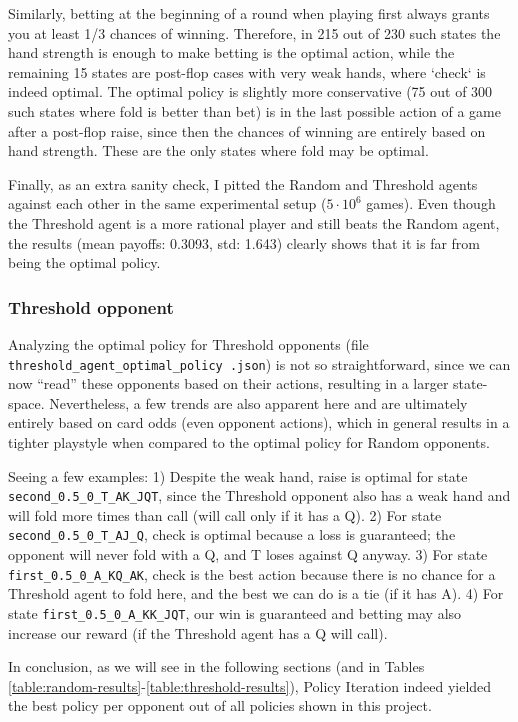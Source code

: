 Similarly, betting at the beginning of a round when playing first always grants you at least 1/3 chances of winning. Therefore, in 215 out of 230 such states the hand strength is enough to make betting is the optimal action, while the remaining 15 states are post-flop cases with very weak hands, where `check` is indeed optimal. The optimal policy is slightly more conservative (75 out of 300 such states where fold is better than bet) is in the last possible action of a game after a post-flop raise, since then the chances of winning are entirely based on hand strength. These are the only states where fold may be optimal.

Finally, as an extra sanity check, I pitted the Random and Threshold agents against each other in the same experimental setup ($5\cdot10^6$ games). Even though the Threshold agent is a more rational player and still beats the Random agent, the results (mean payoffs: 0.3093, std: 1.643) clearly shows that it is far from being the optimal policy.

\subsubsection{Threshold opponent}

Analyzing the optimal policy for Threshold opponents (file \texttt{threshold\_agent\_optimal\_policy .json}) is not so straightforward, since we can now ``read'' these opponents based on their actions, resulting in a larger state-space. Nevertheless, a few trends are also apparent here and are ultimately entirely based on card odds (even opponent actions), which in general results in a tighter playstyle when compared to the optimal policy for Random opponents. 

Seeing a few examples: 1) Despite the weak hand, raise is optimal for state \Verb|second_0.5_0_T_AK_JQT|, since the Threshold opponent also has a weak hand and will fold more times than call (will call only if it has a Q). 2) For state \Verb|second_0.5_0_T_AJ_Q|, check is optimal because a loss is guaranteed; the opponent will never fold with a Q, and T loses against Q anyway. 3) For state \Verb|first_0.5_0_A_KQ_AK|, check is the best action because there is no chance for a Threshold agent to fold here, and the best we can do is a tie (if it has A). 4) For state \Verb|first_0.5_0_A_KK_JQT|, our win is guaranteed and betting may also increase our reward (if the Threshold agent has a Q will call).

In conclusion, as we will see in the following sections (and in Tables \ref{table:random-results}-\ref{table:threshold-results}), Policy Iteration indeed yielded the best policy per opponent out of all policies shown in this project.

